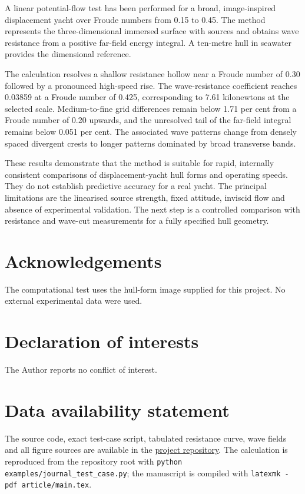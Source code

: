 \documentclass{jfm}
\begin{document}
A linear potential-flow test has been performed for a broad, image-inspired
displacement yacht over Froude numbers from 0.15 to 0.45. The method represents
the three-dimensional immersed surface with sources and obtains wave
resistance from a positive far-field energy integral. A ten-metre hull in
seawater provides the dimensional reference.

The calculation resolves a shallow resistance hollow near a Froude number of
0.30 followed by a pronounced high-speed rise. The wave-resistance coefficient
reaches 0.03859 at a Froude number of 0.425, corresponding to 7.61 kilonewtons
at the selected scale. Medium-to-fine grid differences remain below 1.71 per
cent from a Froude number of 0.20 upwards, and the unresolved tail of the
far-field integral remains below 0.051 per cent. The associated wave patterns
change from densely spaced divergent crests to longer patterns dominated by
broad transverse bands.

These results demonstrate that the method is suitable for rapid, internally
consistent comparisons of displacement-yacht hull forms and operating speeds.
They do not establish predictive accuracy for a real yacht. The principal
limitations are the linearised source strength, fixed attitude, inviscid flow
and absence of experimental validation. The next step is a controlled
comparison with resistance and wave-cut measurements for a fully specified
hull geometry.

\section*{Acknowledgements}

The computational test uses the hull-form image supplied for this project. No
external experimental data were used.

\section*{Declaration of interests}

The Author reports no conflict of interest.

\section*{Data availability statement}

The source code, exact test-case script, tabulated resistance curve, wave fields
and all figure sources are available in the
\href{https://github.com/ignaziomviola/wave-resistance/tree/codex/displacement-yacht-bem}{project repository}.
The calculation is reproduced from the repository root with
\texttt{python examples/journal\_test\_case.py}; the manuscript is compiled
with \texttt{latexmk -pdf article/main.tex}.



\end{document}
